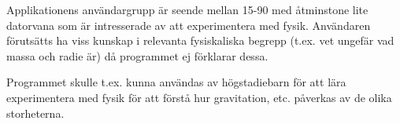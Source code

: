 Applikationens användargrupp är seende mellan 15-90 med åtminstone
lite datorvana som är intresserade av att experimentera med fysik.
Användaren förutsätts ha viss kunskap i relevanta fysiskaliska
begrepp (t.ex. vet ungefär vad massa och radie är) då programmet
ej förklarar dessa.

Programmet skulle t.ex. kunna användas av högstadiebarn för att lära
experimentera med fysik för att förstå hur gravitation, etc. påverkas
av de olika storheterna.

